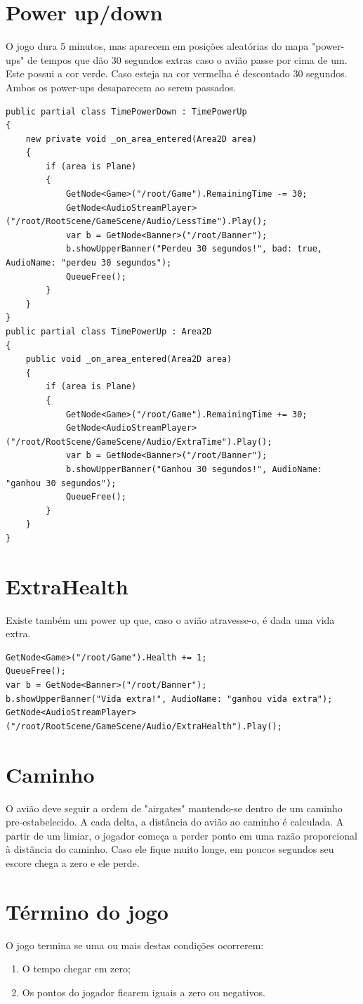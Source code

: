 \section*{Power up/down}
O jogo dura 5 minutos, mas aparecem em posições aleatórias do mapa "power-ups" de tempos que dão 30 segundos extras caso o avião passe por cima de um. 
Este possui a cor verde. Caso esteja na cor vermelha é descontado 30 segundos. Ambos os power-ups desaparecem ao serem passados.

\begin{lstlisting}
public partial class TimePowerDown : TimePowerUp
{
    new private void _on_area_entered(Area2D area)
    {
        if (area is Plane)
        {
            GetNode<Game>("/root/Game").RemainingTime -= 30;
            GetNode<AudioStreamPlayer>("/root/RootScene/GameScene/Audio/LessTime").Play();
            var b = GetNode<Banner>("/root/Banner");
            b.showUpperBanner("Perdeu 30 segundos!", bad: true, AudioName: "perdeu 30 segundos");
            QueueFree();
        }
    }
}
public partial class TimePowerUp : Area2D
{
    public void _on_area_entered(Area2D area)
    {
        if (area is Plane)
        {
            GetNode<Game>("/root/Game").RemainingTime += 30;
            GetNode<AudioStreamPlayer>("/root/RootScene/GameScene/Audio/ExtraTime").Play();
            var b = GetNode<Banner>("/root/Banner");
            b.showUpperBanner("Ganhou 30 segundos!", AudioName: "ganhou 30 segundos");
            QueueFree();
        }
    }
}    
\end{lstlisting}

\section*{ExtraHealth}
Existe também um power up que, caso o avião atravesse-o, é dada uma vida extra.

\begin{lstlisting}
GetNode<Game>("/root/Game").Health += 1;
QueueFree();
var b = GetNode<Banner>("/root/Banner");
b.showUpperBanner("Vida extra!", AudioName: "ganhou vida extra");
GetNode<AudioStreamPlayer>("/root/RootScene/GameScene/Audio/ExtraHealth").Play();
\end{lstlisting}

\section*{Caminho}
O avião deve seguir a ordem de "airgates" mantendo-se dentro de um caminho pre-estabelecido. A cada delta, a distância do avião ao caminho é calculada. A partir de um limiar, o jogador começa a perder ponto em uma razão proporcional à distância do caminho. Caso ele fique muito longe, em poucos segundos seu escore chega a zero e ele perde.

\section*{Término do jogo}
O jogo termina se uma ou mais destas condições ocorrerem:
\begin{enumerate}
    \item O tempo chegar em zero;
    \item Os pontos do jogador ficarem iguais a zero ou negativos.
\end{enumerate}

